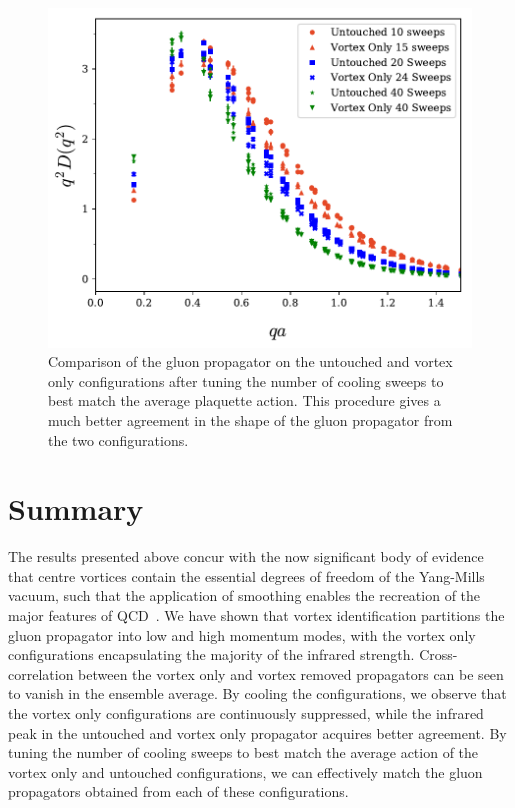 %
\begin{figure}[htb!]
\centering
\includegraphics[width=\linewidth]{./ScalarGluComp_q2_UVOActionMatch.pdf}
\caption[Comparison of the gluon propagator on the untouched and vortex only configurations after tuning the number of cooling sweeps to best match the average plaquette action.]{\label{fig:UVOActionMatch}Comparison of the gluon propagator on the untouched and vortex only configurations after tuning the number of cooling sweeps to best match the average plaquette action. This procedure gives a much better agreement in the shape of the gluon propagator from the two configurations.}
\end{figure}
%

\section{Summary}
The results presented above concur with the now significant body of evidence that centre vortices contain the essential degrees of freedom of the Yang-Mills vacuum, such that the application of smoothing enables the recreation of the major features of QCD~\cite{Bertle:2001xd,Trewartha:2015ida,Trewartha:2015nna,Trewartha:2017ive,DelDebbio:1998luz}. We have shown that vortex identification partitions the gluon propagator into low and high momentum modes, with the vortex only configurations encapsulating the majority of the infrared strength. Cross-correlation between the vortex only and vortex removed propagators can be seen to vanish in the ensemble average. By cooling the configurations, we observe that the vortex only configurations are continuously suppressed, while the infrared peak in the untouched and vortex only propagator acquires better agreement. By tuning the number of cooling sweeps to best match the average action of the vortex only and untouched configurations, we can effectively match the gluon propagators obtained from each of these configurations.\\

